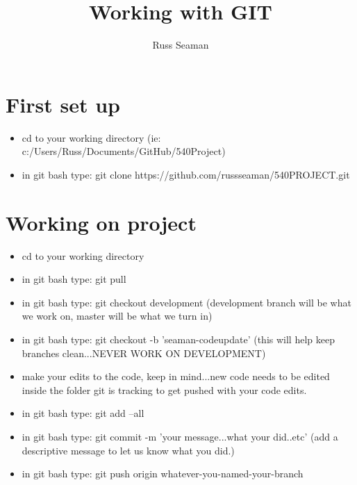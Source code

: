 \documentclass[options]{article}
\title{Working with GIT}
\author{Russ Seaman}
\begin{document}
	\maketitle
	\section{First set up}
	\begin{itemize}
		\item cd to your working directory (ie: c:/Users/Russ/Documents/GitHub/540Project)
		\item in git bash type: git clone https://github.com/russseaman/540PROJECT.git
	\end{itemize}
	\section{Working on project}
	\begin{itemize}
		\item cd to your working directory
		\item in git bash type: git pull
		\item in git bash type: git checkout development (development branch will be what we work on, master will be what we turn in)
		\item in git bash type: git checkout -b 'seaman-codeupdate' (this will help keep branches clean...NEVER WORK ON DEVELOPMENT)
		\item make your edits to the code, keep in mind...new code needs to be edited inside the folder git is tracking to get pushed with your code edits.
		\item in git bash type: git add --all
		\item in git bash type: git commit -m 'your message...what your did..etc' (add a descriptive message to let us know what you did.)
		\item in git bash type: git push origin whatever-you-named-your-branch
		
	\end{itemize}
\end{document}
